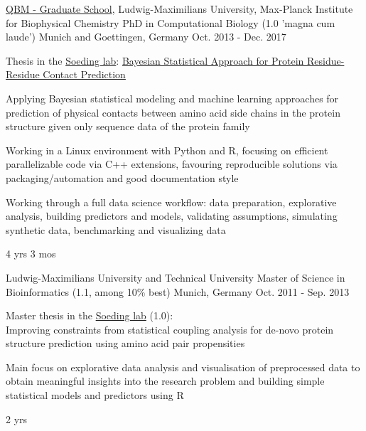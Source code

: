 

\begin{cventries}

  \cventrynew
  	{\href{http://www.qbm.genzentrum.lmu.de/}{QBM - Graduate School}, Ludwig-Maximilians University, Max-Planck Institute for Biophysical Chemistry}
  	{PhD in Computational Biology (1.0 'magna cum laude')} 
	{Munich and Goettingen, Germany}
	{Oct. 2013 - Dec. 2017}
	{
		\begin{cvitems}
			\item {Thesis in the \href{http://www.mpibpc.mpg.de/soeding}{Soeding lab}: \href{https://edoc.ub.uni-muenchen.de/21635/}{Bayesian Statistical Approach for Protein Residue-Residue Contact Prediction} }
			\item {Applying Bayesian statistical modeling and machine learning approaches for prediction of physical contacts between amino acid side chains in the protein structure given only sequence data of the protein family}
			\item {Working in a Linux environment with Python and R, focusing on efficient parallelizable code via C++ extensions, favouring reproducible solutions via packaging/automation and good documentation style}
			\item{Working through a full data science workflow: data preparation, explorative analysis, building predictors and models, validating assumptions, simulating synthetic data, benchmarking and visualizing data}
		\end{cvitems}
	}
	{4 yrs 3 mos}

  \cventrynew
  	{Ludwig-Maximilians University and Technical University}
    {Master of Science in Bioinformatics (1.1, among 10\% best)} 
	{Munich, Germany}
	{Oct. 2011 - Sep. 2013}
	{
		\begin{cvitems}
			\item {Master thesis in the \href{http://www.mpibpc.mpg.de/soeding}{Soeding lab} (1.0):\\
			Improving constraints from statistical coupling analysis for de-novo protein structure prediction using amino acid pair propensities}
			\item {Main focus on explorative data analysis and visualisation of preprocessed data to obtain meaningful insights into the research problem and building simple statistical models and predictors using R}
		\end{cvitems}
	}
	{2 yrs}


\end{cventries}
